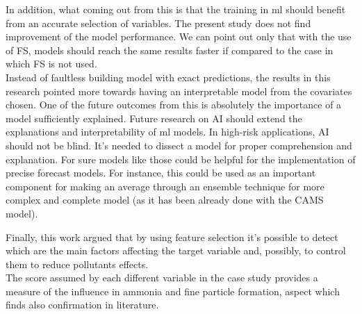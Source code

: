 In addition, what coming out from this is that the training in \acrshort{ml} should benefit from an accurate selection of variables. 
The present study does not find improvement of the model performance. We can point out only that with the use of FS, models should reach the same results faster if compared to the case in which FS is not used.\\
Instead of faultless building model with exact predictions, the results in this research pointed more towards having an interpretable model from the covariates chosen. 
One of the future outcomes from this is absolutely the importance of a model sufficiently explained.
Future research on AI should extend the explanations and interpretability of \acrshort{ml} models.
In high-risk applications, AI should not be blind. 
It's needed to dissect a model for proper comprehension and explanation.
For sure models like those could be helpful for the implementation of precise forecast models.  
For instance, this could be used as an important component for making an average through an ensemble technique for more complex and complete model (as it has been already done with the CAMS model).
\par
Finally, this work argued that by using feature selection it's possible to detect which are the main factors affecting the target variable and, possibly, to control them to reduce pollutants effects.\\
The score assumed by each different variable in the case study provides a measure of the influence in ammonia and fine particle formation, aspect which finds also confirmation in literature.
\begin{comment}
Looking forward, further attempts for reducing pollutant formation should be made by procedures actually used.
\end{comment}
